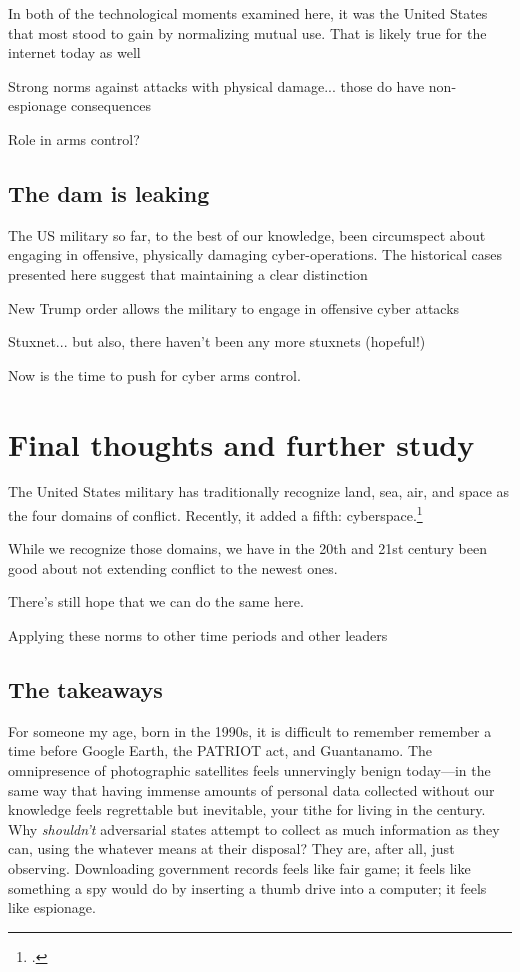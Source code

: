 \documentclass[11pt]{memoir}
\begin{document}
In both of the technological moments examined here, it was the United States that most stood to gain by normalizing mutual use. That is likely true for the internet today as well

Strong norms against attacks with physical damage... those do have non-espionage consequences

Role in arms control?

\subsection{The dam is leaking}
The US military so far, to the best of our knowledge, been circumspect about engaging in offensive, physically damaging cyber-operations. The historical cases presented here suggest that maintaining a clear distinction

New Trump order allows the military to engage in offensive cyber attacks

Stuxnet... but also, there haven't been any more stuxnets (hopeful!)

Now is the time to push for cyber arms control.

\section{Final thoughts and further study}
The United States military has traditionally recognize land, sea, air, and space as the four domains of conflict. Recently, it added a fifth: cyberspace.\footcite{carafano_americas_2018}

While we recognize those domains, we have in the 20th and 21st century been good about not extending conflict to the newest ones.

There's still hope that we can do the same here.


Applying these norms to other time periods and other leaders

\subsection{The takeaways}

For someone my age, born in the 1990s, it is difficult to remember remember a time before Google Earth, the PATRIOT act, and Guantanamo. The omnipresence of photographic satellites feels unnervingly benign today---in the same way that having immense amounts of personal data collected without our knowledge feels regrettable but inevitable, your tithe for living in the  century. Why \emph{shouldn't} adversarial states attempt to collect as much information as they can, using the whatever means at their disposal? They are, after all, just observing. Downloading government records feels like fair game; it feels like something a spy would do by inserting a thumb drive into a computer; it feels like espionage.
\end{document}
